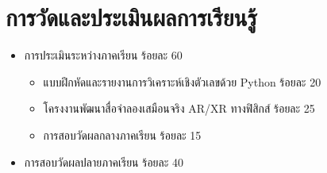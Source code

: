 \section*{การวัดและประเมินผลการเรียนรู้}
\begin{itemize}[leftmargin=1.5em]
    \item การประเมินระหว่างภาคเรียน ร้อยละ 60
    \begin{itemize}
        \item แบบฝึกหัดและรายงานการวิเคราะห์เชิงตัวเลขด้วย Python ร้อยละ 20
        \item โครงงานพัฒนาสื่อจำลองเสมือนจริง AR/XR ทางฟิสิกส์ ร้อยละ 25
        \item การสอบวัดผลกลางภาคเรียน ร้อยละ 15
    \end{itemize}
    \item การสอบวัดผลปลายภาคเรียน ร้อยละ 40
\end{itemize}

